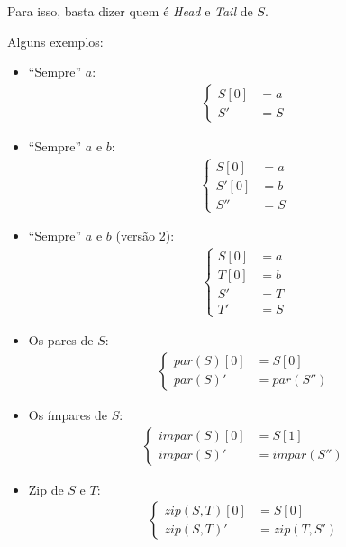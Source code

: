 \documentclass{article}
\newcommand{\Head}{\emph{Head}}
\newcommand{\Tail}{\emph{Tail}}
\begin{document}
Para isso, basta dizer quem é
\Head{} e \Tail{} de \(S\).

Alguns exemplos:
\begin{multicols}{2}
\begin{itemize}
    \item ``Sempre'' \(a\):
    \begin{align*} \begin{cases}
        S[0] &= a \\
        S'   &= S
    \end{cases} \end{align*}

    \item ``Sempre'' \(a\) e \(b\):
    \begin{align*} \begin{cases}
        S [0] &= a \\
        S'[0] &= b \\
        S''   &= S
    \end{cases} \end{align*}

    \item ``Sempre'' \(a\) e \(b\) (versão 2):
    \begin{align*} \begin{cases}
        S[0] &= a \\
        T[0] &= b \\
        S'   &= T \\
        T'   &= S
    \end{cases} \end{align*}

    \item Os pares de \(S\):
    \begin{align*} \begin{cases}
        par(S)[0] &= S[0] \\
        par(S)'   &= par(S'')
    \end{cases} \end{align*}

    \item Os ímpares de \(S\):
    \begin{align*} \begin{cases}
        impar(S)[0] &= S[1] \\
        impar(S)'   &= impar(S'')
    \end{cases} \end{align*}

    \item Zip de \(S\) e \(T\):
    \begin{align*} \begin{cases}
        zip(S, T)[0] &= S[0] \\
        zip(S, T)'   &= zip(T, S')
    \end{cases} \end{align*}


\end{itemize}
\end{multicols}
\end{document}
